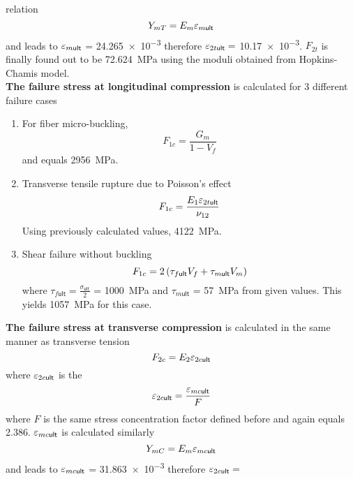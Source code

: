 \documentclass[a4paper,twosided,11pt,DIV14]{scrartcl}
\newcommand{\veps}{\vareps}
\begin{document}
relation
%
\begin{equation}
  Y_{mT} = E_m \veps_{m\textsf{ult}}
\end{equation}
and leads to $\veps_{m\textsf{ult}}$ = \num{24.265e-3} therefore $\veps_{2t\textsf{ult}}=$
\num{10.17e-3}. $F_{2t}$ is finally found out to be \SI{72.624}{MPa} using the
moduli obtained from Hopkins-Chamis model.
%
\\\textbf{The failure stress at longitudinal compression} is calculated for 3
different failure cases
\begin{enumerate}
\item For fiber micro-buckling,
  \begin{equation}
    F_{1c} = \frac{G_m}{1-V_f}
  \end{equation}
  and equals \SI{2956}{MPa}.

\item Transverse tensile rupture due to Poisson's effect
%
  \begin{equation}
    F_{1c} = \frac{E_{1}\veps_{2t\textsf{ult}}}{\nu_{12}}
  \end{equation}
  Using previously calculated values, \SI{4122}{MPa}.

\item Shear failure without buckling
%
  \begin{equation}
    F_{1c} =  2\left(\tau_{f\textsf{ult}}V_f + \tau_{m\textsf{ult}}V_m\right)
  \end{equation}
  where
    $\tau_{f\textsf{ult}} = \frac{\sigma_{\textsf{ult}}}{2}$ = \SI{1000}{MPa}
    and $\tau_{m\textsf{ult}}$ = \SI{57}{MPa} from given values. This yields
    \SI{1057}{MPa} for this case.
\end{enumerate}
%
%
\textbf{The failure stress at transverse compression} is calculated in the same
manner as transverse tension
%
\begin{equation}
  F_{2c} = E_{2} \veps_{2c\textsf{ult}}
\end{equation}
%
where $\veps_{2c\textsf{ult}}$ is the
%
\begin{equation}
  \veps_{2c\textsf{ult}} = \frac{\veps_{mc\textsf{ult}}}{F}
\end{equation}
%
where $F$ is the same stress concentration factor defined before and again
equals 2.386.
$\veps_{mc\textsf{ult}}$ is calculated similarly
%
\begin{equation}
  Y_{mC} = E_m \veps_{mc\textsf{ult}}
\end{equation}
and leads to $\veps_{mc\textsf{ult}}$ = \num{31.863e-3} therefore $\veps_{2c\textsf{ult}}=$
\end{document}
